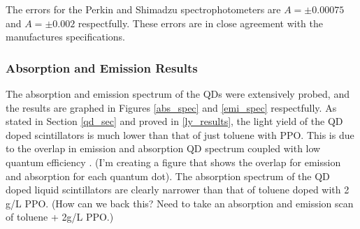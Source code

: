 \documentclass{JINST}
\begin{document}
The errors for the Perkin and Shimadzu spectrophotometers are $A=\pm0.00075$ and $A=\pm0.002$ respectfully. These errors are in close agreement with the manufactures specifications\cite{?}.

\subsubsection{Absorption and Emission Results}\label{abs_emi_results}
The absorption and emission spectrum of the QDs were extensively probed, and the results are graphed in Figures \ref{abs_spec} and \ref{emi_spec} respectfully. As stated in Section \ref{qd_sec} and proved in \ref{ly_results}, the light yield of the QD doped scintillators is much lower than that of just toluene with PPO. This is due to the overlap in emission and absorption QD spectrum coupled with low quantum efficiency \cite{lindley14}. (I'm creating a figure that shows the overlap for emission and absorption for each quantum dot). The absorption spectrum of the QD doped liquid scintillators are clearly narrower than that of toluene doped with 2 g/L PPO.
(How can we back this? Need to take an absorption and emission scan of toluene + 2g/L PPO.)
\end{document}
